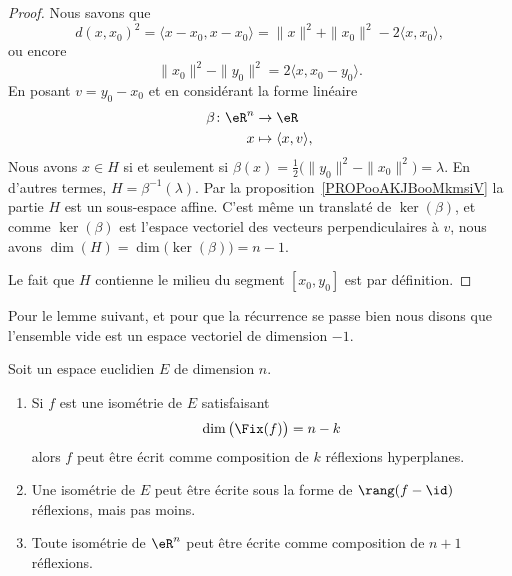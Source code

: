 \begin{proof}
    Nous savons que
    \begin{equation}
        d(x,x_0)^2=\langle x-x_0, x-x_0\rangle =\| x \|^2+\| x_0 \|^2-2\langle x, x_0\rangle,
    \end{equation}
    ou encore
    \begin{equation}
        \| x_0 \|^2-\| y_0 \|^2=2\langle x, x_0-y_0\rangle .
    \end{equation}
    En posant \( v=y_0-x_0\) et en considérant la forme linéaire
    \begin{equation}
        \begin{aligned}
            \beta\colon \eR^n&\to \eR \\
            x&\mapsto \langle x, v\rangle ,
        \end{aligned}
    \end{equation}
    Nous avons \( x\in H\) si et seulement si \( \beta(x)=\frac{ 1 }{2}\big( \| y_0 \|^2-\| x_0 \|^2 \big)=\lambda\). En d'autres termes, \( H=\beta^{-1}(\lambda)\). Par la proposition~\ref{PROPooAKJBooMkmsiV} la partie \( H\) est un sous-espace affine. C'est même un translaté de \( \ker(\beta)\), et comme \( \ker(\beta)\) est l'espace vectoriel des vecteurs perpendiculaires à \( v\), nous avons \( \dim(H)=\dim\big( \ker(\beta) \big)=n-1\).

    Le fait que \( H\) contienne le milieu du segment \( [x_0,y_0]\) est par définition.
\end{proof}

Pour le lemme suivant, et pour que la récurrence se passe bien nous disons que l'ensemble vide est un espace vectoriel de dimension \( -1\).
\begin{lemma}       \label{LEMooJCDRooGAmlwp}
    Soit un espace euclidien \( E\) de dimension \( n\).
    \begin{enumerate}
        \item       \label{ITEMooFYEDooIJZBjP}
            Si \( f\) est une isométrie de \( E\) satisfaisant
            \begin{equation}
                \dim\big( \Fix(f) \big)=n-k
            \end{equation}
            alors \( f\) peut être écrit comme composition de \( k\) réflexions hyperplanes.
        \item       \label{ITEMooJTZVooWvyfDD}
            Une isométrie de \( E\) peut être écrite sous la forme de \( \rang(f-\id)\) réflexions, mais pas moins.
        \item       \label{ITEMooUCZWooSbyPwt}
            Toute isométrie de \( \eR^n\) peut être écrite comme composition de \( n+1\) réflexions.
    \end{enumerate}
\end{lemma}

